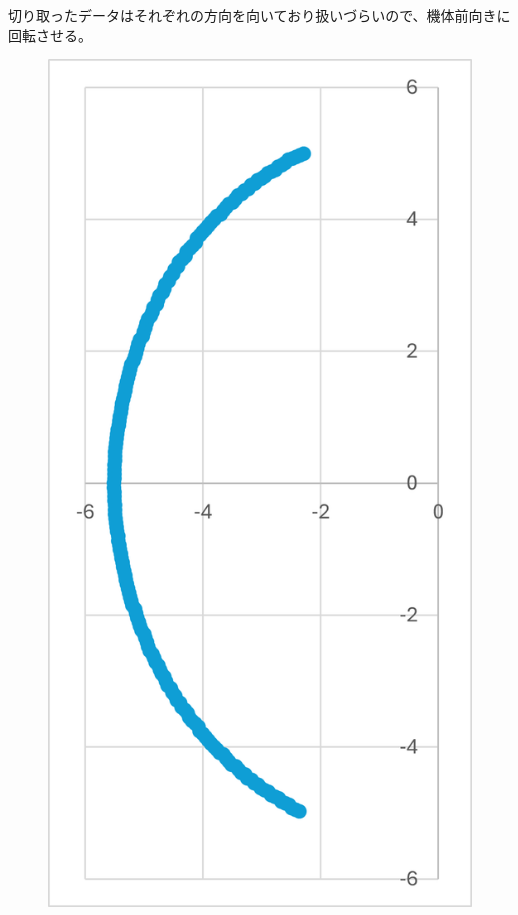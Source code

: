 \documentclass[uplatex,dvipdfmx,a4paper]{jsarticle}
\begin{document}
    切り取ったデータはそれぞれの方向を向いており扱いづらいので、機体前向きに回転させる。
    \begin{figure}[H]
      \begin{minipage}[b]{0.45\linewidth}
        \centering
        \includegraphics[keepaspectratio, scale=0.5]{Photo/画像1.png}

\end{minipage}
\end{figure}
\end{document}
